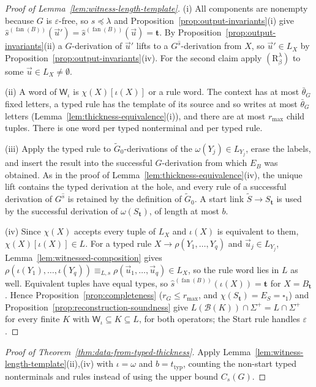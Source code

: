 \documentclass[11pt]{article}
\numberwithin{equation}{section}
\theoremstyle{plain}
\theoremstyle{definition}
\theoremstyle{remark}
\newcommand{\Wit}{\mathsf{W}}
\newcommand{\tuple}[1]{\vec{#1}}
\newcommand{\blank}{\square}
\newcommand{\eps}{\varepsilon}
\newcommand{\fan}{\operatorname{fan}}
\theoremstyle{plain}
\begin{document}
\begin{proof}[Proof of Lemma~\ref{lem:witness-length-template}]
(i) All components are nonempty because $G$ is $\eps$-free, so $s\preceq\lambda$
and Proposition~\ref{prop:output-invariants}(i) give
$\widehat s^{(\fan(B))}(\tuple u')=\widehat s^{(\fan(B))}(\tuple u)=\mathbf t$.  By
Proposition~\ref{prop:output-invariants}(ii) a $G$-derivation of $\tuple u'$ lifts
to a $G^{\widehat s}$-derivation from $X$, so $\tuple u'\in L_X$ by
Proposition~\ref{prop:output-invariants}(iv).  For the second claim apply
$(\mathrm R_\beta^\lambda)$ to some $\tuple u\in L_X\ne\emptyset$.

(ii) A word of $\Wit_\iota$ is $\chi(X)[\iota(X)]$ or a rule word.  The context has at
most $\bar\theta_G$ fixed letters, a typed rule has the template of its source
and so writes at most $\bar\theta_G$ letters
(Lemma~\ref{lem:thickness-equivalence}(i)), and there are at most $r_{\max}$
child tuples.  There is one word per typed nonterminal and per typed rule.

(iii) Apply the typed rule to $\widetilde G_0$-derivations of the
$\omega(Y_j)\in L_{Y_j}$, erase the labels, and insert the result into the
successful $G$-derivation from which $E_B$ was obtained.  As in the proof of
Lemma~\ref{lem:thickness-equivalence}(iv), the unique lift contains the typed
derivation at the hole, and every rule of a successful derivation of
$G^{\widehat s}$ is retained by the definition of $\widetilde G_0$.  A start link $\widetilde S\to S_{\mathbf t}$ is used by
the successful derivation of $\omega(S_{\mathbf t})$, of length at most $b$.

(iv) Since $\chi(X)$ accepts every tuple of $L_X$ and $\iota(X)$ is equivalent to them,
$\chi(X)[\iota(X)]\in L$.  For a typed rule $X\to\rho(Y_1,\ldots,Y_q)$ and
$\tuple u_j\in L_{Y_j}$, Lemma~\ref{lem:witnessed-composition} gives
$\rho(\iota(Y_1),\ldots,\iota(Y_q))\equiv_{L,s}\rho(\tuple u_1,\ldots,\tuple u_q)\in L_X$,
so the rule word lies in $L$ as well.  Equivalent tuples have equal types, so
$\widehat s^{(\fan(B))}(\iota(X))=\mathbf t$ for $X=B_{\mathbf t}$.  Hence
Proposition~\ref{prop:completeness} ($r_G\le r_{\max}$, and
$\chi(S_{\mathbf t})=E_S=\blank_1$) and Proposition~\ref{prop:reconstruction-soundness}
give $L(\mathcal B(K))\cap\Sigma^+=L\cap\Sigma^+$ for every finite $K$ with
$\Wit_\iota\subseteq K\subseteq L$, for both operators; the Start rule handles $\eps$.
\end{proof}

\begin{proof}[Proof of Theorem~\ref{thm:data-from-typed-thickness}]
Apply Lemma~\ref{lem:witness-length-template}(ii),(iv) with $\iota=\omega$ and
$b=t_{\mathrm{typ}}$, counting the non-start typed nonterminals and rules instead of
using the upper bound $C_s(G)$.
\end{proof}
\end{document}
